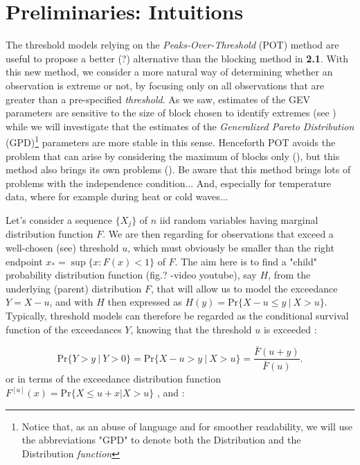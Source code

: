 
\section{Preliminaries: Intuitions}\label{sec::2.1}

The threshold models relying on the \emph{Peaks-Over-Threshold} (POT) method are useful to propose a better (?) alternative than the blocking method in \textbf{2.1}. With this new method, we consider a more natural way of determining whether an observation is extreme or not, by focusing only on all observations that are greater than a pre-specified \emph{threshold}. As we saw, estimates of the GEV parameters are sensitive to the size of block chosen to identify extremes (see ) while we will investigate that the estimates of the \emph{Generalized Pareto Distribution} (GPD)\footnote{Notice that, as an abuse of language and for smoother readability, we will use the abbreviations "GPD" to denote both the Distribution and the Distribution \emph{function} } parameters are more stable in this sense. Henceforth POT avoids the problem that can arise by considering the maximum of blocks only (), but this method also brings its own problems (). Be aware that this method brings lots of problems with the independence condition... And, especially for temperature data, where for example during heat or cold waves...
\newline

Let's consider a sequence $\{X_j\}$ of $n$ iid random variables having marginal distribution function $F$. We are then regarding for observations that exceed a well-chosen (see) threshold $u$, which must obviously be smaller than the right endpoint $x_*=\sup\{x:F(x)<1\}$ of $F$. The aim here is to find a "child" probability distribution function (fig.? -video youtube), say $H$, from the underlying (parent) distribution $F$, that will allow us to model the exceedance $Y=X-u$, and  with $H$ then expressed as $\boxed{H(y)=\text{Pr}\{X-u\leq y \ | \ X>u\}}$. Typically, threshold models can therefore be regarded as the conditional survival function of the exceedances $Y$, knowing that the threshold $u$ is exceeded \cite[pp.147]{beirlant_statistics_2006} :

\begin{equation}\label{survpar}
\text{Pr}\big\{Y>y\ |\ Y>0\big\}=\text{Pr}\big\{X-u>y\ |\ X>u\big\}=\frac{\bar{F}(u+y)}{\bar{F}(u)}.
\end{equation}
or in terms of the exceedance distribution function $F^{[u]}(x)=\text{Pr}\{X\leq u+x|X>u\}$
\cite[pp.12]{reiss_statistical_2007}, \cite{charras_extreme_2013} and \cite{rosso_extreme_2015} :

